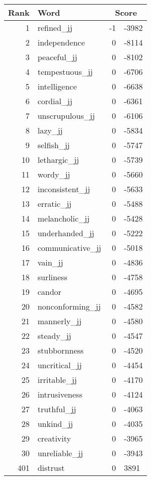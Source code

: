 \begin{longtable}[!htbp]{| rlr@{.}l |}
    \hline
    \textbf{Rank} & \textbf{Word} & \multicolumn{2}{c|}{\textbf{Score}} \\
    \hline
    \endhead
    1 & refined\_jj & -1 & -3982 \\
    2 & independence & 0 & -8114 \\
    3 & peaceful\_jj & 0 & -8102 \\
    4 & tempestuous\_jj & 0 & -6706 \\
    5 & intelligence & 0 & -6638 \\
    6 & cordial\_jj & 0 & -6361 \\
    7 & unscrupulous\_jj & 0 & -6106 \\
    8 & lazy\_jj & 0 & -5834 \\
    9 & selfish\_jj & 0 & -5747 \\
    10 & lethargic\_jj & 0 & -5739 \\
    11 & wordy\_jj & 0 & -5660 \\
    12 & inconsistent\_jj & 0 & -5633 \\
    13 & erratic\_jj & 0 & -5488 \\
    14 & melancholic\_jj & 0 & -5428 \\
    15 & underhanded\_jj & 0 & -5222 \\
    16 & communicative\_jj & 0 & -5018 \\
    17 & vain\_jj & 0 & -4836 \\
    18 & surliness & 0 & -4758 \\
    19 & candor & 0 & -4695 \\
    20 & nonconforming\_jj & 0 & -4582 \\
    21 & mannerly\_jj & 0 & -4580 \\
    22 & steady\_jj & 0 & -4547 \\
    23 & stubbornness & 0 & -4520 \\
    24 & uncritical\_jj & 0 & -4454 \\
    25 & irritable\_jj & 0 & -4170 \\
    26 & intrusiveness & 0 & -4124 \\
    27 & truthful\_jj & 0 & -4063 \\
    28 & unkind\_jj & 0 & -4035 \\
    29 & creativity & 0 & -3965 \\
    30 & unreliable\_jj & 0 & -3943 \\
    401 & distrust & 0 & 3891 \\

\end{longtable}
